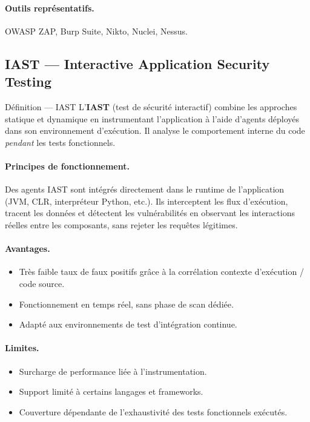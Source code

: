\paragraph{Outils représentatifs.}
OWASP ZAP, Burp Suite, Nikto, Nuclei, Nessus.

\subsection{IAST --- Interactive Application Security Testing}

\begin{definitionbox}{Définition --- IAST}
  L'\textbf{IAST} (test de sécurité interactif) combine les approches statique
  et dynamique en instrumentant l'application à l'aide d'agents déployés dans
  son environnement d'exécution. Il analyse le comportement interne du code
  \textit{pendant} les tests fonctionnels.
\end{definitionbox}

\paragraph{Principes de fonctionnement.}
Des agents IAST sont intégrés directement dans le runtime de l'application
(JVM, CLR, interpréteur Python, etc.). Ils interceptent les flux d'exécution,
tracent les données et détectent les vulnérabilités en observant les interactions
réelles entre les composants, sans rejeter les requêtes légitimes.

\paragraph{Avantages.}
\begin{itemize}
  \item Très faible taux de faux positifs grâce à la corrélation
    contexte d'exécution / code source.
  \item Fonctionnement en temps réel, sans phase de scan dédiée.
  \item Adapté aux environnements de test d'intégration continue.
\end{itemize}

\paragraph{Limites.}
\begin{itemize}
  \item Surcharge de performance liée à l'instrumentation.
  \item Support limité à certains langages et frameworks.
  \item Couverture dépendante de l'exhaustivité des tests fonctionnels exécutés.
\end{itemize}

